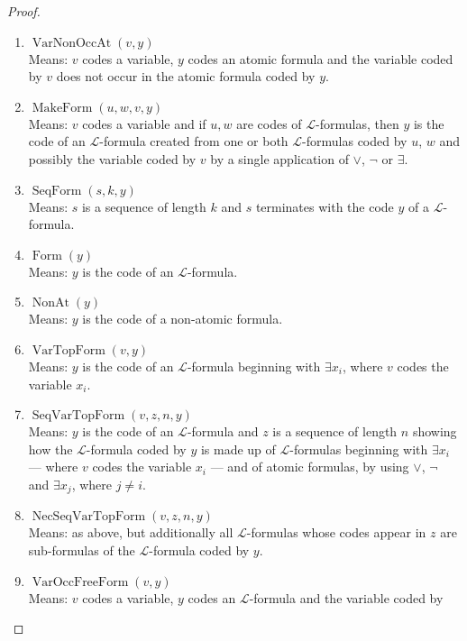 \begin{proof}
\begin{enumerate}
        \item $\operatorname{VarNonOccAt}(v,y)$\\
        Means: $v$ codes a variable, $y$ codes an atomic formula and 
        the variable coded by $v$ does not occur in the atomic formula coded by $y$.
        \item $\operatorname{MakeForm}(u,w,v,y)$\\
        Means: $v$ codes a variable and if $u,w$ are codes of $\mathcal{L}$-formulas, 
        then $y$ is the code of an $\mathcal{L}$-formula created from one or 
        both $\mathcal{L}$-formulas coded by $u$, $w$ and possibly the variable coded by $v$ 
        by a single application of ${\lor}$, ${\neg}$ or ${\exists}$.
        \item $\operatorname{SeqForm}(s,k,y)$\\
        Means: $s$ is a sequence of length $k$ and $s$ terminates with the code $y$ of a 
        $\mathcal{L}$-formula.
        \item $\operatorname{Form}(y)$\\
        Means: $y$ is the code of an $\mathcal{L}$-formula.
        \item $\operatorname{NonAt}(y)$\\
        Means: $y$ is the code of a non-atomic formula.
        \item $\operatorname{VarTopForm}(v,y)$\\
        Means: $y$ is the code of an $\mathcal{L}$-formula beginning with $\exists x_i$,
        where $v$ codes the variable $x_i$.
        \item $\operatorname{SeqVarTopForm}(v,z,n,y)$\\
        Means: $y$ is the code of an $\mathcal{L}$-formula and $z$ is a sequence of length $n$ 
        showing how the $\mathcal{L}$-formula coded by $y$ is made up of $\mathcal{L}$-formulas 
        beginning with $\exists x_i$ — where $v$ codes the variable $x_i$ — and of atomic formulas,
        by using ${\lor}$, ${\neg}$ and ${\exists x_j}$, where $j\neq i$.
        \item $\operatorname{NecSeqVarTopForm}(v,z,n,y)$\\
        Means: as above, but additionally all $\mathcal{L}$-formulas whose codes appear in $z$
        are sub-formulas of the $\mathcal{L}$-formula coded by $y$.
        \item $\operatorname{VarOccFreeForm}(v,y)$\\
        Means: $v$ codes a variable, $y$ codes an $\mathcal{L}$-formula and the variable coded by

\end{enumerate}
\end{proof}

